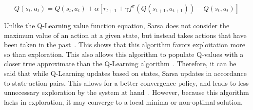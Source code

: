 \documentclass[12pt,american]{report}
\begin{document}
        \begin{equation}
            \label{eq:Sarsa value function}
            Q(s_{t},a_{t}) = Q(s_{t},a_{t}) + \alpha[r_{t+1} + \gamma f^{\pi}(Q(s_{t+1},a_{t+1}))-Q(s_{t},a_{t})]
        \end{equation}
        
        Unlike the Q-Learning value function equation, Sarsa does not consider the maximum value of an action at a given state, but instead takes actions that have been taken in the past~\cite{Eden}. This shows that this algorithm favors exploitation more so than exploration. This also allows this algorithm to populate Q-values with a closer true approximate than the Q-Learning algorithm~\cite{sprague2003multiple}. Therefore, it can be said that while Q-Learning updates based on states, Sarsa updates in accordance to state-action pairs.  This allows for a better convergence policy, and leads to less unnecessary exploration by the system at hand~\cite{sutton1996generalization}.  However, because this algorithm lacks in exploration, it may converge to a local minima or non-optimal solution.
        
\end{document}
